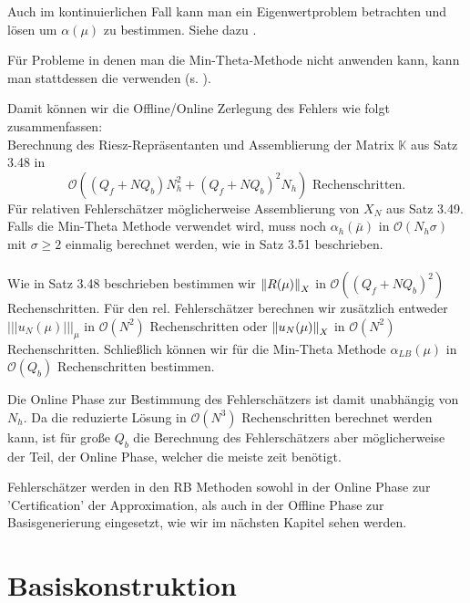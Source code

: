 Auch im kontinuierlichen Fall kann man ein Eigenwertproblem betrachten und lösen um $\alpha(\mu)$ zu bestimmen. Siehe dazu \cite{Haa11}.

Für Probleme in denen man die Min-Theta-Methode nicht anwenden kann, kann man stattdessen die  verwenden (s. \cite{HRSP07}).

Damit können wir die Offline/Online Zerlegung des Fehlers wie folgt zusammenfassen:
\\
Berechnung des Riesz-Repräsentanten und Assemblierung der Matrix $\mathbb{K}$ aus Satz 3.48 in 
\[
\mathcal{O}((Q_f+NQ_b)N_h^2+(Q_f+NQ_b)^2N_h) \text{ Rechenschritten.}
\]
Für relativen Fehlerschätzer möglicherweise Assemblierung von $X_N$ aus Satz 3.49.
Falls die Min-Theta Methode verwendet wird, muss noch $\alpha_h(\bar{\mu})$ in $\mathcal{O}(N_h\sigma)$ mit $\sigma\ge 2$ einmalig berechnet werden, wie in Satz 3.51 beschrieben.\\

\\
Wie in Satz 3.48 beschrieben bestimmen wir $\left\Vert R(\mu)\right\Vert_X$ in $\mathcal{O}((Q_f+NQ_b)^2)$ Rechenschritten.
Für den rel. Fehlerschätzer berechnen wir zusätzlich entweder $|||u_N(\mu)|||_\mu$ in $\mathcal{O}(N^2)$ Rechenschritten oder $\left\Vert u_N(\mu)\right\Vert_X$ in $\mathcal{O}(N^2)$ Rechenschritten.
Schließlich können wir für die Min-Theta Methode $\alpha_{LB}(\mu)$ in $\mathcal{O}(Q_b)$ Rechenschritten bestimmen.

Die Online Phase zur Bestimmung des Fehlerschätzers ist damit unabhängig von $N_h$.
Da die reduzierte Lösung in $\mathcal{O}(N^3)$ Rechenschritten berechnet werden kann, ist für große $Q_b$ die Berechnung des Fehlerschätzers aber möglicherweise der Teil, der Online Phase, welcher die meiste zeit benötigt.

Fehlerschätzer werden in den RB Methoden sowohl in der Online Phase zur 'Certification' der Approximation, als auch in der Offline Phase zur Basisgenerierung eingesetzt, wie wir im nächsten Kapitel sehen werden.
\newpage

\section{Basiskonstruktion}

